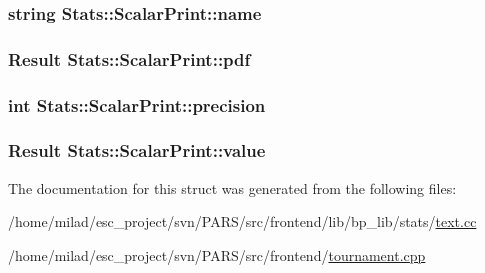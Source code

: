 \label{structStats_1_1ScalarPrint_a920e3f724dce9d9a24810a16ffacb4bb}
\hypertarget{structStats_1_1ScalarPrint_a5be372119c7d55a9d96688aaa060cc79}{
\subsubsection[{name}]{\setlength{\rightskip}{0pt plus 5cm}string {\bf Stats::ScalarPrint::name}}}
\label{structStats_1_1ScalarPrint_a5be372119c7d55a9d96688aaa060cc79}
\hypertarget{structStats_1_1ScalarPrint_acd1df1a0346a2bd5dd90086550663eea}{
\subsubsection[{pdf}]{\setlength{\rightskip}{0pt plus 5cm}Result {\bf Stats::ScalarPrint::pdf}}}
\label{structStats_1_1ScalarPrint_acd1df1a0346a2bd5dd90086550663eea}
\hypertarget{structStats_1_1ScalarPrint_a879b6ff384c6685845e308118c0d82d3}{
\subsubsection[{precision}]{\setlength{\rightskip}{0pt plus 5cm}int {\bf Stats::ScalarPrint::precision}}}
\label{structStats_1_1ScalarPrint_a879b6ff384c6685845e308118c0d82d3}
\hypertarget{structStats_1_1ScalarPrint_a45fe47d5d3b39603727f5641c51ba4fd}{
\subsubsection[{value}]{\setlength{\rightskip}{0pt plus 5cm}Result {\bf Stats::ScalarPrint::value}}}
\label{structStats_1_1ScalarPrint_a45fe47d5d3b39603727f5641c51ba4fd}


The documentation for this struct was generated from the following files:\begin{DoxyCompactItemize}
\item 
/home/milad/esc\_\-project/svn/PARS/src/frontend/lib/bp\_\-lib/stats/\hyperlink{text_8cc}{text.cc}\item 
/home/milad/esc\_\-project/svn/PARS/src/frontend/\hyperlink{frontend_2tournament_8cpp}{tournament.cpp}\end{DoxyCompactItemize}
